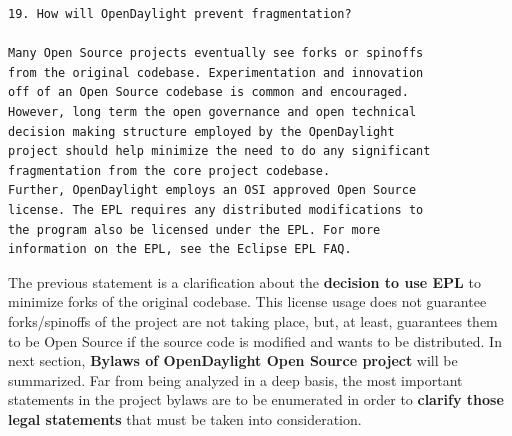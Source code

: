\documentclass[a4paper, 12pt]{book}
\begin{document}
\begin{verbatim}
19. How will OpenDaylight prevent fragmentation?

Many Open Source projects eventually see forks or spinoffs
from the original codebase. Experimentation and innovation
off of an Open Source codebase is common and encouraged.
However, long term the open governance and open technical
decision making structure employed by the OpenDaylight
project should help minimize the need to do any significant
fragmentation from the core project codebase.
Further, OpenDaylight employs an OSI approved Open Source
license. The EPL requires any distributed modifications to
the program also be licensed under the EPL. For more
information on the EPL, see the Eclipse EPL FAQ.
\end{verbatim}
\noindent The previous statement is a clarification about the \textbf{decision to use EPL} to minimize forks of the original codebase. This license usage does not guarantee forks/spinoffs of the project are not taking place, but, at least, guarantees them to be Open Source if the source code is modified and wants to be distributed. In next section, \textbf{Bylaws of OpenDaylight Open Source project} will be summarized. Far from being analyzed in a deep basis, the most important statements in the project bylaws are to be enumerated in order to \textbf{clarify those legal statements} that must be taken into consideration.
\end{document}
